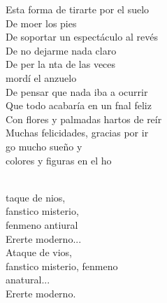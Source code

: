 \begin{cancion}
Esta forma de tirarte por el suelo\\
	De moer los pies\\
De soportar un espectáculo al revés\\
De no dejarme nada claro\\
	De per la nta de las veces\\
	 mordí el anzuelo\\
De pensar que nada iba a ocurrir\\
	Que todo acabaría en un fnal feliz\\
Con flores y palmadas hartos de reír\\
	Muchas felicidades, gracias por ir\\
	go mucho sueño y\\
	 colores y figuras en el ho \\\jump\\
	\begin{chorus}%
	taque de nios,\\
	fanstico misterio, \\
	fenmeno antiural \\
	Ererte moderno...\\
	Ataque de vios,\\
	fanstico misterio, fenmeno  \\
	anatural...\\
	Ererte moderno.\\
	\end{chorus}%
	\jump\\
\end{cancion}%

